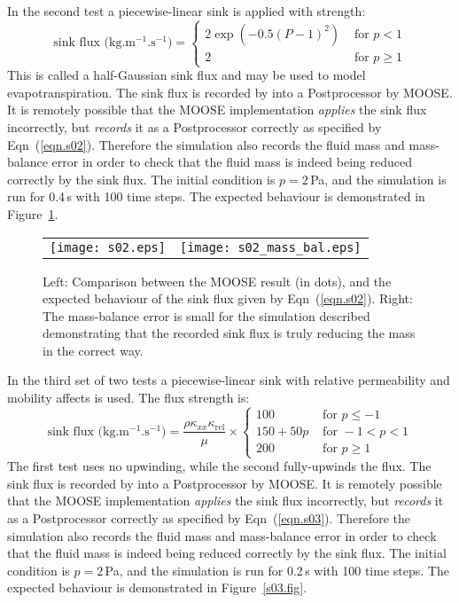 \documentclass[]{scrreprt}
\begin{document}
\noindent In the second test a piecewise-linear sink is applied with strength:
\begin{equation}
\mbox{sink flux (kg.m$^{-1}$.s$^{-1}$)} = \left\{
\begin{array}{ll}
2\exp(-0.5(P-1)^{2}) & \mbox{ for } p < 1 \\
2 & \mbox{ for } p\geq 1
\end{array}
\right.
\label{eqn.s02}
\end{equation}
This is called a half-Gaussian sink flux and may be used to model
evapotranspiration.  The sink flux is recorded by into a Postprocessor by MOOSE.  It is
remotely possible that the MOOSE implementation {\em applies} the sink
flux incorrectly, but {\em records} it as a Postprocessor correctly as
specified by Eqn~(\ref{eqn.s02}).  Therefore the simulation also
records the fluid mass and mass-balance error in order to check that
the fluid mass is indeed being reduced correctly by the sink flux.
The initial condition is $p=2$\,Pa, and the simulation is run for
0.4\,s with 100 time steps.  The expected behaviour is demonstrated in
Figure~\ref{s02.fig}.

\begin{figure}[htb]
\centering
\begin{tabular}{cc}
\texttt{[image: s02.eps]} &
\texttt{[image: s02\_mass\_bal.eps]}
\end{tabular}
\caption{Left: Comparison between the MOOSE result (in dots), and the
  expected behaviour of the sink flux given by Eqn~(\ref{eqn.s02}).
  Right: The mass-balance error is small for the simulation described
  demonstrating that the recorded sink flux is truly reducing the mass
  in the correct way.}
\label{s02.fig}
\end{figure}


\noindent In the third set of two tests a piecewise-linear sink with relative
permeability and mobility affects is used.  The flux strength is:
\begin{equation}
\mbox{sink flux (kg.m$^{-1}$.s$^{-1}$)} =
\frac{\rho\kappa_{xx}\kappa_{\mathrm{rel}}}{\mu}
\times \left\{
\begin{array}{ll}
100 & \mbox{ for } p \leq -1 \\
150+50p& \mbox{ for } -1<p<1 \\
200 & \mbox{ for } p\geq 1
\end{array}
\right.
\label{eqn.s03}
\end{equation}
The first test uses no upwinding, while the second fully-upwinds the flux.
The sink flux is recorded by into a Postprocessor by MOOSE.  It is
remotely possible that the MOOSE implementation {\em applies} the sink
flux incorrectly, but {\em records} it as a Postprocessor correctly as
specified by Eqn~(\ref{eqn.s03}).  Therefore the simulation also
records the fluid mass and mass-balance error in order to check that
the fluid mass is indeed being reduced correctly by the sink flux.
The initial condition is $p=2$\,Pa, and the simulation is run for
0.2\,s with 100 time steps.  The expected behaviour is demonstrated in
Figure~\ref{s03.fig}.
\end{document}
